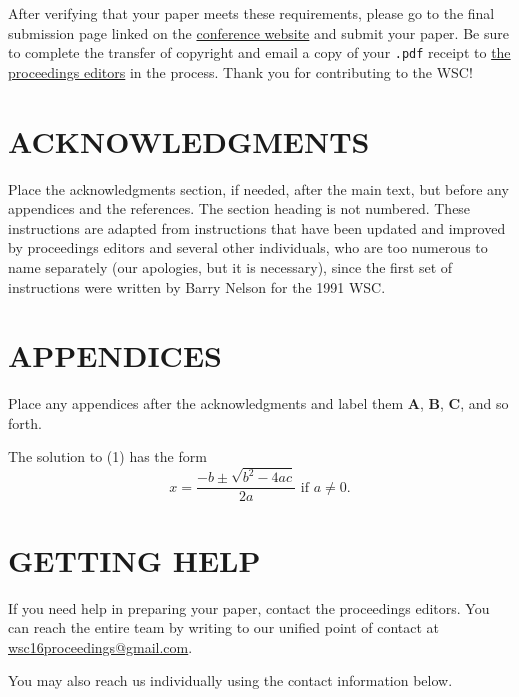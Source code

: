 \documentclass{wscpaperproc}
\theoremstyle{wsc}
\begin{document}
After verifying that your paper meets these requirements, please go to the final submission page linked on the \href{http://www.wintersim.org}{conference website} \cite{WSC} and submit your paper.
Be sure to complete the transfer of copyright and email a copy of your {\tt .pdf} receipt to \href{mailto://wsc16proceedings@gmail.com}{the proceedings editors} in the process.
Thank you for contributing to the WSC!

\section*{ACKNOWLEDGMENTS}
Place the acknowledgments section, if needed, after the main text, but before any appendices and the references. The section heading is not numbered.
These instructions are adapted from instructions that have been updated and improved by proceedings editors and several other individuals, who are too numerous to name separately (our apologies, but it is necessary), since the first set of instructions were written by Barry Nelson for the 1991 WSC.

\appendix

\section{APPENDICES} \label{app:quadratic}
Place any appendices after the acknowledgments and label them
\textbf{A}, \textbf{B}, \textbf{C}, and so forth.

The solution to (1) has the form
\begin{equation} \label{eq: quadratic sol}
x = \frac{-b \pm \sqrt{b^2-4ac}}{2a} \mbox{ if } a \ne 0.
\end{equation}

\section{GETTING HELP}
If you need help in preparing your paper, contact the proceedings editors. You can reach the entire team by writing to our unified point of contact at \href{mailto://wsc16proceedings@gmail.com}{wsc16proceedings@gmail.com}.

You may also reach us individually using the contact information below.

\vspace{6pt}
\end{document}
